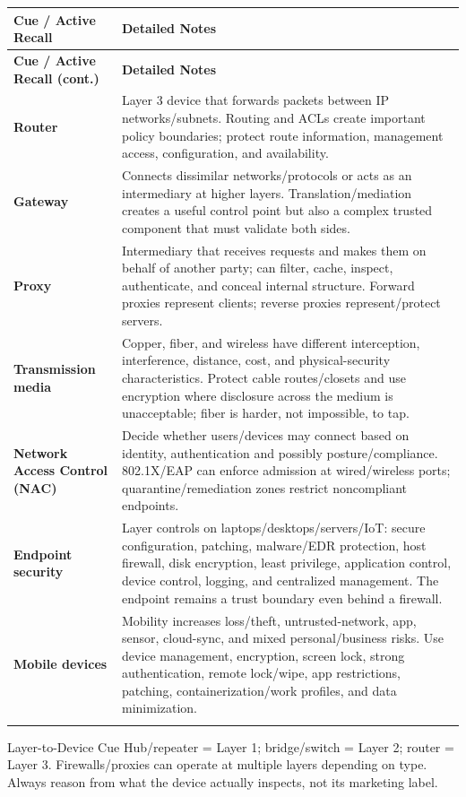 \documentclass[10pt,letterpaper]{article}
\makeatletter
\newenvironment{cornell}{\rowcolors{2}{white}{notebg}\begin{longtable}{@{}>{\raggedright\arraybackslash\columncolor{cuebg}\color{navy}\bfseries}p{0.285\textwidth}>{\raggedright\arraybackslash}p{0.65\textwidth}@{}}\rowcolor{navy}\color{white}\textbf{Cue / Active Recall} & \color{white}\textbf{Detailed Notes}\\ \hline\endfirsthead\rowcolor{navy}\color{white}\textbf{Cue / Active Recall (cont.)} & \color{white}\textbf{Detailed Notes}\\ \hline\endhead}{\end{longtable}}
\newcommand{\noterow}[2]{#1 & #2\\\arrayrulecolor{line}\hline}\newcommand{\source}[1]{\par{\footnotesize\color{teal}\textit{Source: CBK, #1}}\par}
\makeatother
\begin{document}
\begin{cornell}
\noterow{Router}{Layer 3 device that forwards packets between IP networks/subnets. Routing and ACLs create important policy boundaries; protect route information, management access, configuration, and availability.}
\noterow{Gateway}{Connects dissimilar networks/protocols or acts as an intermediary at higher layers. Translation/mediation creates a useful control point but also a complex trusted component that must validate both sides.}
\noterow{Proxy}{Intermediary that receives requests and makes them on behalf of another party; can filter, cache, inspect, authenticate, and conceal internal structure. Forward proxies represent clients; reverse proxies represent/protect servers.}
\noterow{Transmission media}{Copper, fiber, and wireless have different interception, interference, distance, cost, and physical-security characteristics. Protect cable routes/closets and use encryption where disclosure across the medium is unacceptable; fiber is harder, not impossible, to tap.}
\noterow{Network Access Control (NAC)}{Decide whether users/devices may connect based on identity, authentication and possibly posture/compliance. 802.1X/EAP can enforce admission at wired/wireless ports; quarantine/remediation zones restrict noncompliant endpoints.}
\noterow{Endpoint security}{Layer controls on laptops/desktops/servers/IoT: secure configuration, patching, malware/EDR protection, host firewall, disk encryption, least privilege, application control, device control, logging, and centralized management. The endpoint remains a trust boundary even behind a firewall.}
\noterow{Mobile devices}{Mobility increases loss/theft, untrusted-network, app, sensor, cloud-sync, and mixed personal/business risks. Use device management, encryption, screen lock, strong authentication, remote lock/wipe, app restrictions, patching, containerization/work profiles, and data minimization.}
\end{cornell}

\begin{exambox}{Layer-to-Device Cue}
Hub/repeater = Layer 1; bridge/switch = Layer 2; router = Layer 3. Firewalls/proxies can operate at multiple layers depending on type. Always reason from what the device actually inspects, not its marketing label.
\end{exambox}
\end{document}
